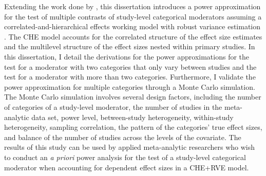 Extending the work done by \textcite{vembye2023}, this dissertation introduces a power approximation for the test of multiple contrasts of study-level categorical moderators assuming a correlated-and-hierarchical effects working model with robust variance estimation \autocite[e.\,g. CHE+RVE;][]{pustejovsky2022, hedges2010}. The CHE model accounts for the correlated structure of the effect size estimates and the multilevel structure of the effect sizes nested within primary studies. In this dissertation, I detail the derivations for the power approximations for the test for a moderator with two categories that only vary between studies and the test for a moderator with more than two categories. Furthermore, I validate the power approximation for multiple categories through a Monte Carlo simulation. The Monte Carlo simulation involves several design factors, including the number of categories of a study-level moderator, the number of studies in the meta-analytic data set, power level, between-study heterogeneity, within-study heterogeneity, sampling correlation, the pattern of the categories' true effect sizes, and balance of the number of studies across the levels of the covariate. The results of this study can be used by applied meta-analytic researchers who wish to conduct an \textit{a priori} power analysis for the test of a study-level categorical moderator when accounting for dependent effect sizes in a CHE+RVE model.  

